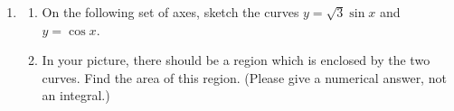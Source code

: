 \documentclass[main]{subfiles}
\begin{document}
\begin{enumerate}
\item 
  \begin{enumerate}
  \item 
    \begin{problem}      
      On the following set of axes, sketch the curves $y = \sqrt{3} \sin
      x$ and $y = \cos x$.
    \end{problem}

    \probonly{\axes[xtick={-3.14, 3.14}, xticklabels={$-\pi$, $\pi$}]}

    \begin{solution}      
      \begin{center}
      \end{center}
    \end{solution}

  \item
    \begin{problem}[0.5in]
      In your picture, there should be a region which is enclosed by the
      two curves.  Find the area of this region.  (Please give a numerical
      answer, not an integral.)
    \end{problem}


\end{enumerate}
\end{enumerate}
\end{document}
